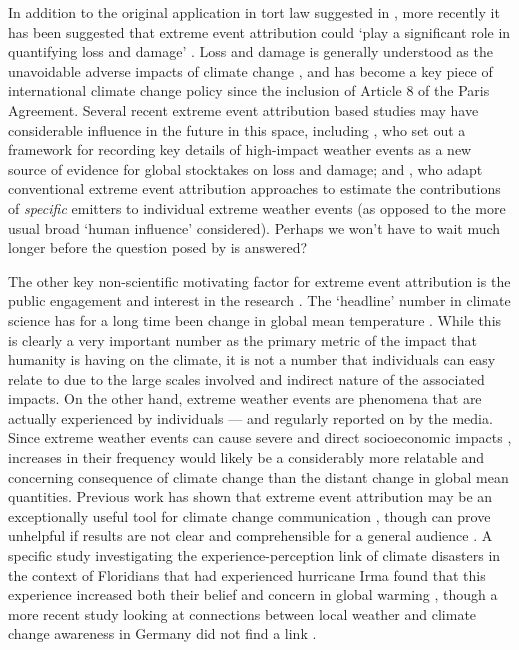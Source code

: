   In addition to the original application in tort law suggested in \citet{allen_liability_2003}, more recently it has been suggested that extreme event attribution could `play a significant role in quantifying loss and damage' \citep{wehner_operational_2022}. Loss and damage is generally understood as the unavoidable adverse impacts of climate change \citep{mace_loss_2016}, and has become a key piece of international climate change policy since the inclusion of Article 8 of the Paris Agreement. Several recent extreme event attribution based studies may have considerable influence in the future in this space, including \citet{clarke_inventories_2021}, who set out a framework for recording key details of high-impact weather events as a new source of evidence for global stocktakes on loss and damage; and \citet{otto_assigning_2017,lott_quantifying_2021}, who adapt conventional extreme event attribution approaches to estimate the contributions of \emph{specific} emitters to individual extreme weather events (as opposed to the more usual broad `human influence' considered). Perhaps we won't have to wait much longer before the question posed by \citeauthor{allen_liability_2003} is answered?

  The other key non-scientific motivating factor for extreme event attribution is the public engagement and interest in the research  \citep{swain_attributing_2020}. The `headline' number in climate science has for a long time been change in global mean temperature \citep{stocker_climate_2013,ipcc_global_2018,masson-delmotte_climate_2021}. While this is clearly a very important number as the primary metric of the impact that humanity is having on the climate, it is not a number that individuals can easy relate to due to the large scales involved and indirect nature of the associated impacts. On the other hand, extreme weather events are phenomena that are actually experienced by individuals --- and regularly reported on by the media. Since extreme weather events can cause severe and direct socioeconomic impacts \citep{fouillet_excess_2006}, increases in their frequency would likely be a considerably more relatable and concerning consequence of climate change than the distant change in global mean quantities. Previous work has shown that extreme event attribution may be an exceptionally useful tool for climate change communication \citep{ettinger_whats_2021}, though can prove unhelpful if results are not clear and comprehensible for a general audience \citep[for example if different attribution studies regarding a single event appear to provide conflicting headline results,][]{osaka_natural_2020}. A specific study investigating the experience-perception link of climate disasters in the context of Floridians that had experienced hurricane Irma found that this experience increased both their belief and concern in global warming \citep{bergquist_experiencing_2019}, though a more recent study looking at connections between local weather and climate change awareness in Germany did not find a link \citep{gartner_experiencing_2021}.

